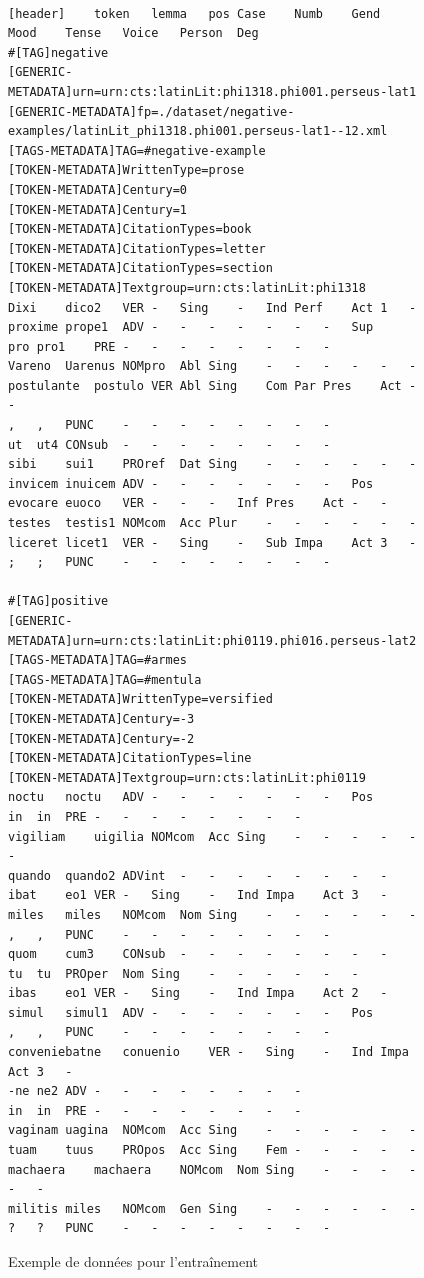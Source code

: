 \begin{figure}
\centering
\begin{adjustbox}{width=0.9\textwidth,keepaspectratio}
\begin{lstlisting}

[header]	token	lemma	pos	Case	Numb	Gend	Mood	Tense	Voice	Person	Deg
#[TAG]negative
[GENERIC-METADATA]urn=urn:cts:latinLit:phi1318.phi001.perseus-lat1
[GENERIC-METADATA]fp=./dataset/negative-examples/latinLit_phi1318.phi001.perseus-lat1--12.xml
[TAGS-METADATA]TAG=#negative-example
[TOKEN-METADATA]WrittenType=prose
[TOKEN-METADATA]Century=0
[TOKEN-METADATA]Century=1
[TOKEN-METADATA]CitationTypes=book
[TOKEN-METADATA]CitationTypes=letter
[TOKEN-METADATA]CitationTypes=section
[TOKEN-METADATA]Textgroup=urn:cts:latinLit:phi1318
Dixi	dico2	VER	-	Sing	-	Ind	Perf	Act	1	-
proxime	prope1	ADV	-	-	-	-	-	-	-	Sup
pro	pro1	PRE	-	-	-	-	-	-	-	-
Vareno	Uarenus	NOMpro	Abl	Sing	-	-	-	-	-	-
postulante	postulo	VER	Abl	Sing	Com	Par	Pres	Act	-	-
,	,	PUNC	-	-	-	-	-	-	-	-
ut	ut4	CONsub	-	-	-	-	-	-	-	-
sibi	sui1	PROref	Dat	Sing	-	-	-	-	-	-
invicem	inuicem	ADV	-	-	-	-	-	-	-	Pos
evocare	euoco	VER	-	-	-	Inf	Pres	Act	-	-
testes	testis1	NOMcom	Acc	Plur	-	-	-	-	-	-
liceret	licet1	VER	-	Sing	-	Sub	Impa	Act	3	-
;	;	PUNC	-	-	-	-	-	-	-	-

#[TAG]positive
[GENERIC-METADATA]urn=urn:cts:latinLit:phi0119.phi016.perseus-lat2
[TAGS-METADATA]TAG=#armes
[TAGS-METADATA]TAG=#mentula
[TOKEN-METADATA]WrittenType=versified
[TOKEN-METADATA]Century=-3
[TOKEN-METADATA]Century=-2
[TOKEN-METADATA]CitationTypes=line
[TOKEN-METADATA]Textgroup=urn:cts:latinLit:phi0119
noctu	noctu	ADV	-	-	-	-	-	-	-	Pos
in	in	PRE	-	-	-	-	-	-	-	-
vigiliam	uigilia	NOMcom	Acc	Sing	-	-	-	-	-	-
quando	quando2	ADVint	-	-	-	-	-	-	-	-
ibat	eo1	VER	-	Sing	-	Ind	Impa	Act	3	-
miles	miles	NOMcom	Nom	Sing	-	-	-	-	-	-
,	,	PUNC	-	-	-	-	-	-	-	-
quom	cum3	CONsub	-	-	-	-	-	-	-	-
tu	tu	PROper	Nom	Sing	-	-	-	-	-	-
ibas	eo1	VER	-	Sing	-	Ind	Impa	Act	2	-
simul	simul1	ADV	-	-	-	-	-	-	-	Pos
,	,	PUNC	-	-	-	-	-	-	-	-
conveniebatne	conuenio	VER	-	Sing	-	Ind	Impa	Act	3	-
-ne	ne2	ADV	-	-	-	-	-	-	-	-
in	in	PRE	-	-	-	-	-	-	-	-
vaginam	uagina	NOMcom	Acc	Sing	-	-	-	-	-	-
tuam	tuus	PROpos	Acc	Sing	Fem	-	-	-	-	-
machaera	machaera	NOMcom	Nom	Sing	-	-	-	-	-	-
militis	miles	NOMcom	Gen	Sing	-	-	-	-	-	-
?	?	PUNC	-	-	-	-	-	-	-	-
\end{lstlisting}%
\end{adjustbox}
\caption{Exemple de données pour l'entraînement}
\label{code:chap4:training-data-format}
\end{figure}

